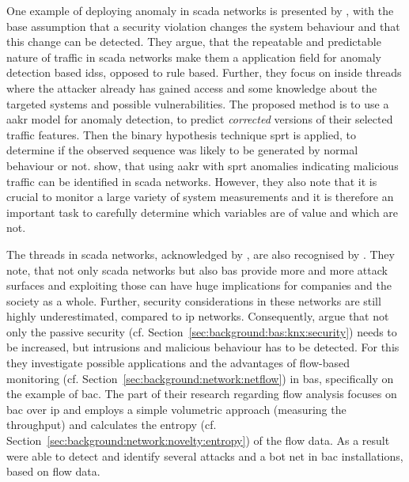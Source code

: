 One example of deploying anomaly in \gls{scada} networks is presented by \textcite{Yang2006}, with the base assumption that a security violation changes the system behaviour and that this change can be detected. They argue, that the repeatable and predictable nature of traffic in \gls{scada} networks make them a application field for anomaly detection based \glspl{ids}, opposed to rule based.
Further, they focus on inside threads where the attacker already has gained access and some knowledge about the targeted systems and possible vulnerabilities.
The proposed method is to use a \gls{aakr} model for anomaly detection, to predict \emph{corrected} versions of their selected traffic features. Then the binary hypothesis technique \gls{sprt} is applied, to determine if the observed sequence was likely to be generated by normal behaviour or not.
\textcite{Yang2006} show, that using \gls{aakr} with \gls{sprt} anomalies indicating malicious traffic can be identified in \gls{scada} networks.
However, they also note that it is crucial to monitor a large variety of system measurements and it is therefore an important task to carefully determine which variables are of value and which are not.

The threads in \gls{scada} networks, acknowledged by \textcite{Yang2006}, are also recognised by \textcite{Celeda2012}. They note, that not only \gls{scada} networks but also \gls{bas} provide more and more attack surfaces and exploiting those can have huge implications for companies and the society as a whole.
Further, security considerations in these networks are still highly underestimated, compared to \gls{ip} networks.
Consequently, \textcite{Celeda2012} argue that not only the passive security (cf. Section~\ref{sec:background:bas:knx:security}) needs to be increased, but intrusions and malicious behaviour has to be detected. For this they investigate possible applications and the advantages of flow-based monitoring (cf. Section~\ref{sec:background:network:netflow}) in \gls{bas}, specifically on the example of \gls{bac}.
The part of their research regarding flow analysis focuses on \gls{bac} over \gls{ip} and employs a simple volumetric approach (measuring the throughput) and calculates the entropy (cf. Section~\ref{sec:background:network:novelty:entropy}) of the flow data.
As a result \textcite{Celeda2012} were able to detect and identify several attacks and a bot net in \gls{bac} installations, based on flow data.

